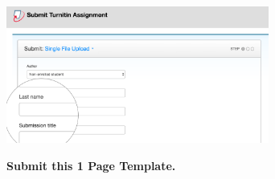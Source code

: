 \documentclass[bigtut]{quiz}\usepackage[]{graphicx}\usepackage[]{color}
\begin{document}
\begin{tutorial}
\begin{enumerate}
\begin{center}
\includegraphics[height=4.5cm]{TurnitinSubmission.png}
\end{center}
\end{enumerate}







\newpage
{}  {\tiny \bf  Submit this 1 Page Template.}


\end{tutorial}
\end{document}
